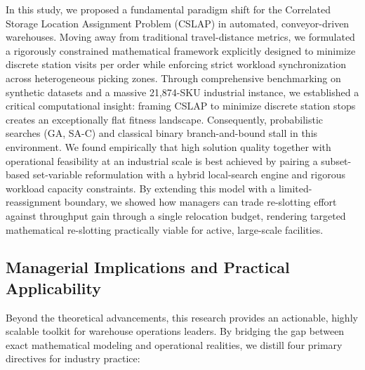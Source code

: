\documentclass[preprint,review,11pt,authoryear]{elsarticle}
\begin{document}
In this study, we proposed a fundamental paradigm shift for the Correlated Storage Location Assignment Problem (CSLAP) in automated, conveyor-driven warehouses. Moving away from traditional travel-distance metrics, we formulated a rigorously constrained mathematical framework explicitly designed to minimize discrete station visits per order while enforcing strict workload synchronization across heterogeneous picking zones. Through comprehensive benchmarking on synthetic datasets and a massive 21,874-SKU industrial instance, we established a critical computational insight: framing CSLAP to minimize discrete station stops creates an exceptionally flat fitness landscape. Consequently, probabilistic searches (GA, SA-C) and classical binary branch-and-bound stall in this environment. We found empirically that high solution quality together with operational feasibility at an industrial scale is best achieved by pairing a subset-based set-variable reformulation with a hybrid local-search engine and rigorous workload capacity constraints. By extending this model with a limited-reassignment boundary, we showed how managers can trade re-slotting effort against throughput gain through a single relocation budget, rendering targeted mathematical re-slotting practically viable for active, large-scale facilities.

\subsection*{Managerial Implications and Practical Applicability}

Beyond the theoretical advancements, this research provides an actionable, highly scalable toolkit for warehouse operations leaders. By bridging the gap between exact mathematical modeling and operational realities, we distill four primary directives for industry practice:
\end{document}
